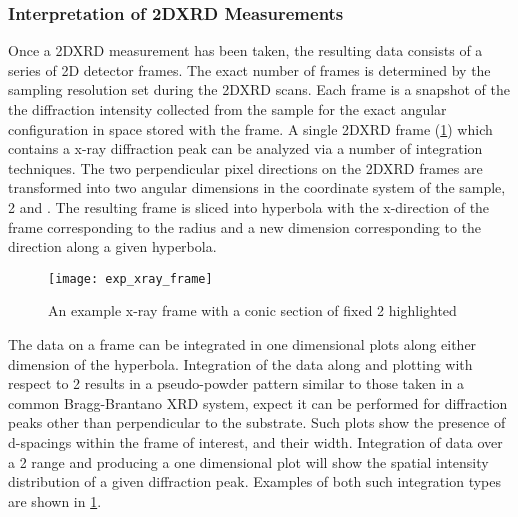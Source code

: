 
\subsubsection{Interpretation of 2DXRD Measurements}
Once a 2DXRD measurement has been taken, the resulting data consists of a series of 2D detector frames. The exact number of frames is determined by the sampling resolution set during the 2DXRD scans. Each frame is a snapshot of the the diffraction intensity collected from the sample for the exact angular configuration in space stored with the frame. A single 2DXRD frame (\cref{fig:exp_xray_frame}) which contains a x-ray diffraction peak can be analyzed via a number of integration techniques. The two perpendicular pixel directions on the 2DXRD frames are transformed into two angular dimensions in the coordinate system of the sample, 2\texttheta{} and \textchi \cite{bobhe}. The resulting frame is sliced into hyperbola with the x-direction of the frame corresponding to the radius and a new dimension \textchi{} corresponding to the direction along a given hyperbola.
\begin{figure}
    \centering
    \texttt{[image: exp\_xray\_frame]}
    \caption{\label{fig:exp_xray_frame}An example x-ray frame with a conic section of fixed 2\texttheta{} highlighted}
\end{figure}

The data on a frame can be integrated in one dimensional plots along either dimension of the hyperbola. Integration of the data along \textchi{} and plotting with respect to 2\texttheta{} results in a pseudo-powder pattern similar to those taken in a common Bragg-Brantano XRD system, expect it can be performed for diffraction peaks other than perpendicular to the substrate. Such plots show the presence of d-spacings within the frame of interest, and their width. Integration of data over a 2\texttheta{} range and producing a one dimensional plot will show the spatial intensity distribution of a given diffraction peak. Examples of both such integration types are shown in \cref{fig:exp_xray_frame}.

